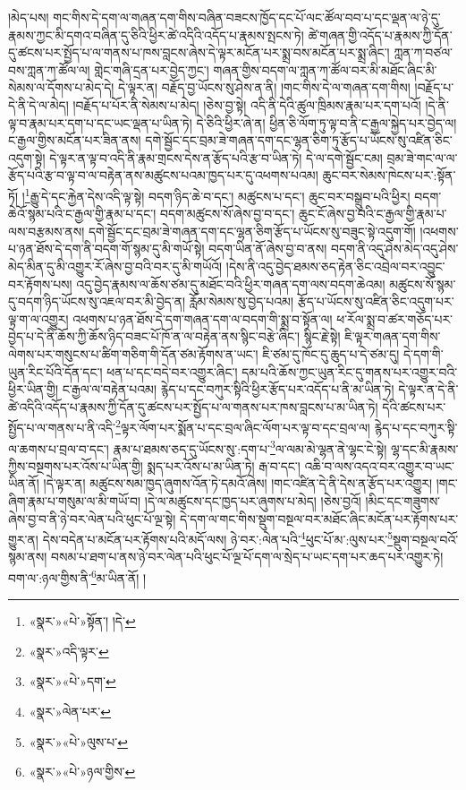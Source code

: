 །མེད་པས། གང་གིས་དེ་དག་ལ་གཞན་དག་གིས་བཞིན་བཟངས་ཁྱོད་དང་པོ་ལང་ཚོལ་བབ་པ་དང་ལྡན་ལ་ཉེ་དུ་རྣམས་ཀྱང་མི་དགའ་བཞིན་དུ་ཅིའི་ཕྱིར་ཚེ་འདིའི་འདོད་པ་རྣམས་སྤངས་ཏེ། ཚེ་གཞན་གྱི་འདོད་པ་རྣམས་ཀྱི་དོན་དུ་ཚངས་པར་སྤྱོད་པ་ལ་གནས་པ་ཁས་བླངས་ཞེས་དེ་ལྟར་མངོན་པར་སྨྲ་བས་མངོན་པར་སྨྲ་ཞིང་། ཀླན་ཀ་བཙལ་བས་ཀླན་ཀ་ཚོལ་ལ། གླེང་གཞི་དྲན་པར་བྱེད་ཀྱང་། གཞན་གྱིས་བདག་ལ་ཀླན་ཀ་ཚོལ་བར་མི་མཐོང་ཞིང་མི་སེམས་ལ་དོགས་པ་མེད་དེ། དེ་ལྟར་ན། བརྗོད་བྱ་ཡོངས་སུ་ཤེས་ན་ནི། །གང་གིས་དེ་ལ་གཞན་དག་གིས། །བརྗོད་པ་དེ་ནི་དེ་ལ་མེད། །བརྗོད་པ་པོར་ནི་སེམས་པ་མེད། །ཅེས་བྱ་སྟེ། འདི་ནི་དེའི་ཚུལ་ཁྲིམས་རྣམ་པར་དག་པའོ། །དེ་ནི་ལྟ་བ་རྣམ་པར་དག་པ་དང་ཡང་ལྡན་པ་ཡིན་ཏེ། དེ་ཅིའི་ཕྱིར་ཞེ་ན། ཕྱིན་ཅི་ལོག་ཏུ་ལྟ་བ་ནི་ང་རྒྱལ་སྐྱེད་པར་བྱེད་ལ། ང་རྒྱལ་གྱིས་མངོན་པར་ཟིན་ནས། དགེ་སྦྱོང་དང་བྲམ་ཟེ་གཞན་དག་དང་ལྷན་ཅིག་ཏུ་རྩོད་པ་ཡོངས་སུ་འཛིན་ཅིང་འདུག་སྟེ། དེ་ལྟར་ན་ལྟ་བ་འདི་ནི་རྣམ་གྲངས་དེས་ན་རྩོད་པའི་རྩ་བ་ཡིན་ཏེ། དེ་ལ་དགེ་སྦྱོང་ངམ། བྲམ་ཟེ་གང་ལ་ལ་རྩོད་པའི་རྩ་བ་ལྟ་བ་ལ་བརྟེན་ནས་མཚུངས་པའམ་ཁྱད་པར་དུ་འཕགས་པའམ། ཆུང་བར་སེམས་ཁེངས་པར་:སྟོན་ཏོ། །\footnote{«སྣར་»«པེ་»སྟོན་། །དེ་}རྒྱུ་དེ་དང་རྐྱེན་དེས་འདི་ལྟ་སྟེ། བདག་ཉིད་ཆེ་བ་དང་། མཚུངས་པ་དང་། ཆུང་བར་བསྒྲུབ་པའི་ཕྱིར། བདག་ཆེའོ་སྙམ་པའི་ང་རྒྱལ་གྱི་རྣམ་པ་དང་། བདག་མཚུངས་སོ་ཞེས་བྱ་བ་དང་། ཆུང་ངོ་ཞེས་བྱ་བའི་ང་རྒྱལ་གྱི་རྣམ་པ་ལས་བརྩམས་ནས། དགེ་སྦྱོང་དང་བྲམ་ཟེ་གཞན་དག་དང་ལྷན་ཅིག་རྩོད་པ་ཡོངས་སུ་བཟུང་སྟེ་འདུག་གོ། །འཕགས་པ་ཉན་ཐོས་དེ་དག་ནི་བདག་གོ་སྙམ་དུ་མི་གཡོ་སྟེ། བདག་ཡིན་ནོ་ཞེས་བྱ་བ་ནས། བདག་ནི་འདུ་ཤེས་མེད་འདུ་ཤེས་མེད་མིན་དུ་མི་འགྱུར་རོ་ཞེས་བྱ་བའི་བར་དུ་མི་གཡོའོ། །དེས་ནི་འདུ་བྱེད་ཐམས་ཅད་རྟེན་ཅིང་འབྲེལ་བར་འབྱུང་བར་རྟོགས་པས། འདུ་བྱེད་རྣམས་ལ་ཆོས་ཙམ་དུ་མཐོང་བའི་ཕྱིར་གཞན་དག་ལས་བདག་ཆེའམ། མཚུངས་སོ་སྙམ་དུ་བདག་ཉིད་ཡོངས་སུ་འཇལ་བར་མི་བྱེད་ན། རློམ་སེམས་སུ་བྱེད་པའམ། རྩོད་པ་ཡོངས་སུ་འཛིན་ཅིང་འདུག་པར་ལྟ་ག་ལ་འགྱུར། འཕགས་པ་ཉན་ཐོས་དེ་དག་གཞན་དག་ལ་བདག་གི་སྨྲ་བ་སྟོན་ལ། ཕ་རོལ་སྨྲ་བ་ཚར་གཅོད་པར་བྱེད་པ་དེ་ནི་ཆོས་ཀྱི་ཆོས་ཉིད་བཟང་པོ་ཁོ་ན་ལ་བརྟེན་ནས་སྙིང་བརྩེ་ཞིང་། སྙིང་རྗེ་སྟེ། ཇི་ལྟར་གཞན་དག་གིས་ལེགས་པར་གསུངས་པ་ཚིག་གཅིག་གི་དོན་ཙམ་རྟོགས་ན་ཡང་། ཇི་ཙམ་དུ་ཁོང་དུ་ཆུད་པ་དེ་ཙམ་དུ། དེ་དག་གི་ཡུན་རིང་པོའི་དོན་དང་། ཕན་པ་དང་བདེ་བར་འགྱུར་ཞིང་། དམ་པའི་ཆོས་ཀྱང་ཡུན་རིང་དུ་གནས་པར་འགྱུར་བའི་ཕྱིར་ཡིན་གྱི། ང་རྒྱལ་ལ་བརྟེན་པའམ། རྙེད་པ་དང་བཀུར་སྟིའི་ཕྱིར་རྩོད་པར་འདོད་པ་ནི་མ་ཡིན་ཏེ། དེ་ལྟར་ན་དེ་ནི་ཚེ་འདིའི་འདོད་པ་རྣམས་ཀྱི་དོན་དུ་ཚངས་པར་སྤྱོད་པ་ལ་གནས་པར་ཁས་བླངས་པ་མ་ཡིན་ཏེ། དེའི་ཚངས་པར་སྤྱོད་པ་ལ་གནས་པ་ནི་འདི་\footnote{«སྣར་»འདི་ལྟར་}ལྟར་ལོག་པར་སྨོན་པ་དང་བྲལ་ཞིང་ལོག་པར་ལྟ་བ་དང་བྲལ་ལ། རྙེད་པ་དང་བཀུར་སྟི་ལ་ཆགས་པ་བྲལ་བ་དང་། རྣམ་པ་ཐམས་ཅད་དུ་ཡོངས་སུ་:དག་པ་\footnote{«སྣར་»«པེ་»དག་}ལ་ལམ་མེ་ལྷན་ནེ་ལྷང་ངེ་སྟེ། ལྷ་དང་མི་རྣམས་ཀྱིས་བསྔགས་པར་འོས་པ་ཡིན་གྱི། སྨད་པར་འོས་པ་མ་ཡིན་ཏེ། རྒ་བ་དང་། འཆི་བ་ལས་འདའ་བར་འགྱུར་བ་ཡང་ཡིན་ནོ། །དེ་ལྟར་ན། མཚུངས་སམ་ཁྱད་ཞུགས་འོན་ཏེ་དམའོ་ཞེས། །གང་འཛིན་དེ་ནི་དེས་ན་རྩོད་པར་འགྱུར། །གང་ཞིག་རྣམ་པ་གསུམ་ལ་མི་གཡོ་བ། །དེ་ལ་མཚུངས་དང་ཁྱད་པར་ཞུགས་པ་མེད། །ཅེས་བྱའོ། །མིང་དང་གཟུགས་ཞེས་བྱ་བ་ནི་ཉེ་བར་ལེན་པའི་ཕུང་པོ་ལྔ་སྟེ། དེ་དག་ལ་གང་གིས་སྡུག་བསྔལ་བར་མཐོང་ཞིང་མངོན་པར་རྟོགས་པར་གྱུར་ན། དེས་བདེན་པ་མངོན་པར་རྟོགས་པའི་མདོ་ལས། ཉེ་བར་:ལེན་པའི་\footnote{«སྣར་»ལེན་པར་}ཕུང་པོ་མ་:ལུས་པར་\footnote{«སྣར་»«པེ་»ལུས་པ་}སྡུག་བསྔལ་བའོ་སྙམ་ནས། བསམ་པ་ཐག་པ་ནས་ཉེ་བར་ལེན་པའི་ཕུང་པོ་ལྔ་པོ་དག་ལ་སྲེད་པ་ཡང་དག་པར་ཆད་པར་འགྱུར་ཏེ། བག་ལ་:ཉལ་གྱིས་ནི་\footnote{«སྣར་»«པེ་»ཉལ་གྱིས་}མ་ཡིན་ནོ། །
